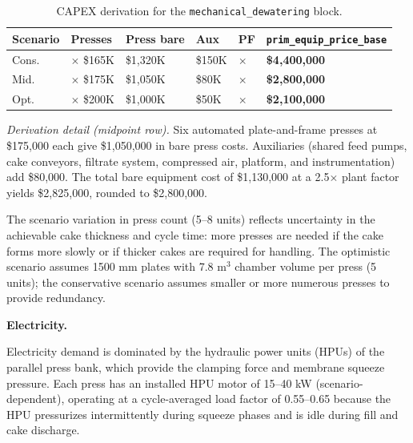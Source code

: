 \begin{table}[h!]
\caption{CAPEX derivation for the \texttt{mechanical\_dewatering} block.}
\centering
\begin{tabular}{>{\raggedright\arraybackslash}p{2.0cm}
				>{\raggedright\arraybackslash}p{2.2cm}
				>{\raggedright\arraybackslash}p{1.8cm}
				>{\raggedright\arraybackslash}p{1.8cm}
				>{\raggedright\arraybackslash}p{1.0cm}
				>{\raggedright\arraybackslash}p{3.0cm}}
\toprule
\textbf{Scenario} & \textbf{Presses} & \textbf{Press bare} & \textbf{Aux} & \textbf{PF} & \texttt{prim\_equip\_price\_base} \\
\midrule
Cons. & 8 $\times$ \$165K & \$1,320K & \$150K & 3.0$\times$ & \textbf{\$4,400,000} \\
Mid.  & 6 $\times$ \$175K & \$1,050K & \$80K  & 2.5$\times$ & \textbf{\$2,800,000} \\
Opt.  & 5 $\times$ \$200K & \$1,000K & \$50K  & 2.0$\times$ & \textbf{\$2,100,000} \\
\bottomrule
\end{tabular}
\end{table}

\noindent \textit{Derivation detail (midpoint row).} Six automated plate-and-frame presses at \$175,000 each give \$1,050,000 in bare press costs. Auxiliaries (shared feed pumps, cake conveyors, filtrate system, compressed air, platform, and instrumentation) add \$80,000. The total bare equipment cost of \$1,130,000 at a 2.5$\times$ plant factor yields \$2,825,000, rounded to \$2,800,000.

\noindent The scenario variation in press count (5--8 units) reflects uncertainty in the achievable cake thickness and cycle time: more presses are needed if the cake forms more slowly or if thicker cakes are required for handling. The optimistic scenario assumes 1500 mm plates with 7.8 m$^3$ chamber volume per press (5 units); the conservative scenario assumes smaller or more numerous presses to provide redundancy.


\medskip
\noindent\textbf{Electricity.}\quad


Electricity demand is dominated by the hydraulic power units (HPUs) of the parallel press bank, which provide the clamping force and membrane squeeze pressure. Each press has an installed HPU motor of 15--40 kW (scenario-dependent), operating at a cycle-averaged load factor of 0.55--0.65 because the HPU pressurizes intermittently during squeeze phases and is idle during fill and cake discharge.

